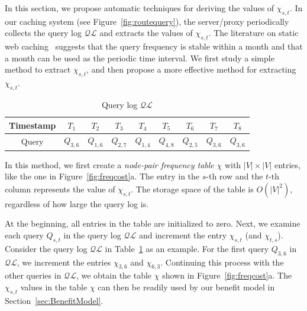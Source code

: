 \documentclass{sig-alternate}
\newcommand{\stitle}[1]{\vspace*{0.4em}\noindent{\bf #1:\/}}
\begin{document}
In this section, we propose automatic techniques for deriving the values of $\chi_{s,t}$.
In our caching system (see Figure~\ref{fig:routequery}), the server/proxy
periodically collects the query log $\mathcal{QL}$ and extracts the values of $\chi_{s,t}$.
The literature on static web caching~\cite{BaezaYates07} suggests that the query frequency is stable within a month
and that a month can be used as the periodic time interval.
We first study a simple method to extract $\chi_{s,t}$,
and then propose a more effective method for extracting $\chi_{s,t}$.















\begin{table}[hbt]
\center
    \begin{tabular}{|c|@{ }c@{ }c@{ }c@{ }c@{ }c@{ }c@{ }c@{ }c@{ }|}
    \hline
    Timestamp & $T_1$ & $T_2$ & $T_3$ & $T_4$ & $T_5$ & $T_6$ & $T_7$ & $T_8$  \\ \hline
    Query  & $Q_{3,6}$ & $Q_{1,6}$ & $Q_{2,7}$  & $Q_{1,4}$  & $Q_{4,8}$  & $Q_{2,5}$  & $Q_{3,6}$  & $Q_{3,6}$ \\ \hline
    \end{tabular}
\caption{Query log $\mathcal{QL}$}
\label{tbl:querylog}
\end{table}



\stitle{Node-pair frequency counting}
%
In this method, we first create a {\em node-pair frequency table}
$\chi$ with $|V| \times |V|$ entries, like the one in Figure~\ref{fig:freqcost}a.
The entry in the $s$-th row and the $t$-th column represents the value of $\chi_{s,t}$.
The storage space of the table is $O(|V|^2)$, regardless of how large the query log is.

At the beginning, all entries in the table are initialized to zero.
Next, we examine each query $Q_{s,t}$ in the query log $\mathcal{QL}$
and increment the entry $\chi_{s,t}$ (and $\chi_{t,s}$).
Consider the query log $\mathcal{QL}$ in Table~\ref{tbl:querylog} as an example.
For the first query $Q_{3,6}$ in $\mathcal{QL}$, we increment the entries $\chi_{3,6}$ and $\chi_{6,3}$.
Continuing this process with the other queries in $\mathcal{QL}$,
we obtain the table $\chi$ shown in Figure~\ref{fig:freqcost}a.
The $\chi_{s,t}$ values in the table $\chi$ can then be readily used by our benefit model in Section~\ref{sec:BenefitModel}.
\end{document}

